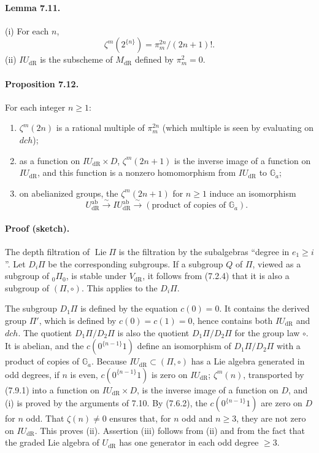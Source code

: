 \documentclass[11pt]{article}
\newcommand{\Ga}{\mathbb G_a}
\newcommand{\Lie}{\operatorname{Lie}}
\newcommand{\dR}{\mathrm{dR}}
\newcommand{\ab}{\mathrm{ab}}
\begin{document}
\paragraph{Lemma 7.11.}
(i) For each $n$,
\[
 \zeta^m(2^{\{n\}})=\pi_m^{2n}/(2n+1)!.
\]
(ii) $IU_{\dR}$ is the subscheme of $M_{\dR}$ defined by $\pi_m^2=0$.

\paragraph{Proposition 7.12.}
For each integer $n\geq1$:
\begin{enumerate}[label=(\roman*)]
\item $\zeta^m(2n)$ is a rational multiple of $\pi_m^{2n}$ (which multiple is seen by evaluating on $dch$);
\item as a function on $IU_{\dR}\times D$, $\zeta^m(2n+1)$ is the inverse image of a function on $IU_{\dR}$, and this function is a nonzero homomorphism from $IU_{\dR}$ to $\Ga$;
\item on abelianized groups, the $\zeta^m(2n+1)$ for $n\geq1$ induce an isomorphism
\[
 U^{\ab}_{\dR}\xrightarrow{\sim}IU^{\ab}_{\dR}\xrightarrow{\sim}(\text{product of copies of }\Ga).
\]
\end{enumerate}

\paragraph{Proof (sketch).}
The depth filtration of $\Lie\Pi$ is the filtration by the subalgebras ``degree in $e_1\geq i$''.
Let $D_i\Pi$ be the corresponding subgroups.
If a subgroup $Q$ of $\Pi$, viewed as a subgroup of ${}_0\Pi_0$, is stable under $V_{\dR}$, it follows from (7.2.4) that it is also a subgroup of $(\Pi,\circ)$.
This applies to the $D_i\Pi$.

The subgroup $D_1\Pi$ is defined by the equation $c(0)=0$.
It contains the derived group $\Pi'$, which is defined by $c(0)=c(1)=0$, hence contains both $IU_{\dR}$ and $dch$.
The quotient $D_1\Pi/D_2\Pi$ is also the quotient $D_1\Pi/D_2\Pi$ for the group law $\circ$.
It is abelian, and the $c(0^{\{n-1\}}1)$ define an isomorphism of $D_1\Pi/D_2\Pi$ with a product of copies of $\Ga$.
Because $IU_{\dR}\subset(\Pi,\circ)$ has a Lie algebra generated in odd degrees, if $n$ is even, $c(0^{\{n-1\}}1)$ is zero on $IU_{\dR}$; $\zeta^m(n)$, transported by (7.9.1) into a function on $IU_{\dR}\times D$, is the inverse image of a function on $D$, and (i) is proved by the arguments of 7.10.
By (7.6.2), the $c(0^{\{n-1\}}1)$ are zero on $D$ for $n$ odd.
That $\zeta(n)\ne0$ ensures that, for $n$ odd and $n\geq3$, they are not zero on $IU_{\dR}$.
This proves (ii).
Assertion (iii) follows from (ii) and from the fact that the graded Lie algebra of $U_{\dR}$ has one generator in each odd degree $\geq3$.
\end{document}
